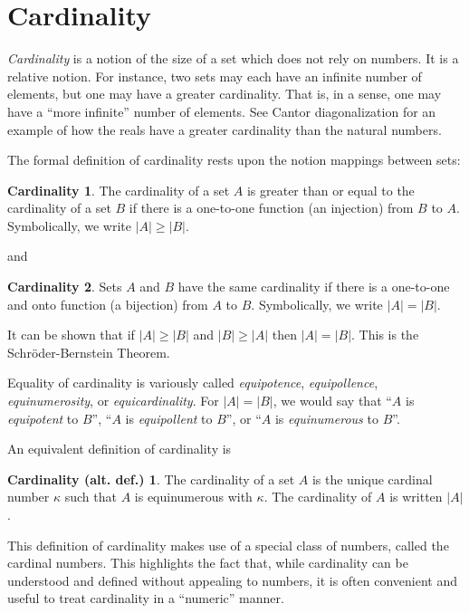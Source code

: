 \documentclass{article}
\theoremstyle{definition}
\newtheorem*{defn}{Cardinality}
\newtheorem*{altdefn}{Cardinality (alt. def.)}
\begin{document}
\section*{Cardinality}

\emph{Cardinality} is a notion of the size of a set which does not rely on numbers.  It is a relative notion.  For instance, two sets may each have an infinite number of elements, but one may have a greater cardinality.  That is, in a sense, one may have a ``more infinite'' number of elements.  See Cantor diagonalization for an example of how the reals have a greater cardinality than the natural numbers.

The formal definition of cardinality rests upon the notion mappings between sets:

\begin{defn}
The cardinality of a set $A$ is greater than or equal to 
the cardinality of a set $B$
if there is a one-to-one function (an injection) from $B$ to $A$.
Symbolically, we write $|A| \geq |B|$.
\end{defn}

and

\begin{defn}
Sets $A$ and $B$ have the same cardinality
if there is a one-to-one and onto function (a bijection) from $A$ to $B$.
Symbolically, we write $|A| = |B|$.
\end{defn}

It can be shown that if $|A| \geq |B|$ and $|B| \geq |A|$ then $|A| = |B|$.
This is the Schröder-Bernstein Theorem.

Equality of cardinality is variously called \emph{equipotence}, \emph{equipollence}, \emph{equinumerosity}, or \emph{equicardinality}.
For $|A| = |B|$, we would say that ``$A$ is \emph{equipotent} to $B$'',
``$A$ is \emph{equipollent} to $B$'', or ``$A$ is \emph{equinumerous} to $B$''.

An equivalent definition of cardinality is

\begin{altdefn}
The cardinality of a set $A$ is the unique cardinal number $\kappa$ such that $A$ is equinumerous with $\kappa$. The cardinality of $A$ is written $|A|$.
\end{altdefn}

This definition of cardinality makes use of a special class of numbers, called the cardinal numbers. This highlights the fact that, while cardinality can be understood and defined without appealing to numbers, it is often convenient and useful to treat cardinality in a ``numeric'' manner.
\end{document}
